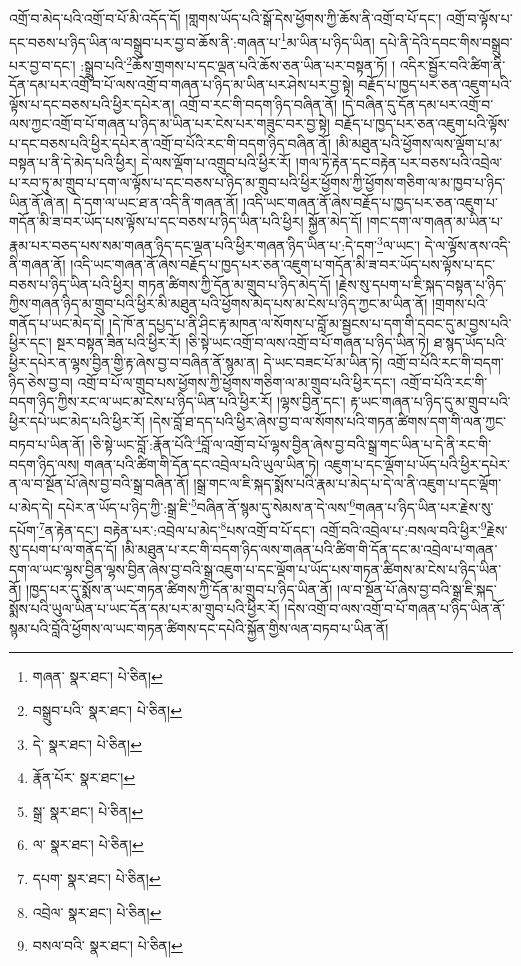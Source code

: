 འགྲོ་བ་མེད་པའི་འགྲོ་བ་པོ་མི་འདོད་དོ། །གླགས་ཡོད་པའི་སྒོ་དེས་ཕྱོགས་ཀྱི་ཆོས་ནི་འགྲོ་བ་པོ་དང་། འགྲོ་བ་ལྟོས་པ་དང་བཅས་པ་ཉིད་ཡིན་ལ་བསྒྲུབ་པར་བྱ་བ་ཆོས་ནི་:གཞན་པ་\footnote{གཞན་  སྣར་ཐང་།  པེ་ཅིན། }མ་ཡིན་པ་ཉིད་ཡིན། དཔེ་ནི་དེའི་དབང་གིས་བསྒྲུབ་པར་བྱ་བ་དང་། :སྒྲུབ་པའི་\footnote{བསྒྲུབ་པའི་  སྣར་ཐང་།  པེ་ཅིན། }ཆོས་གྲགས་པ་དང་ལྡན་པའི་ཆོས་ཅན་ཡིན་པར་བསྟན་ཏོ། །
འདིར་སྦྱོར་བའི་ཚིག་ནི་དོན་དམ་པར་འགྲོ་བ་པོ་ལས་འགྲོ་བ་གཞན་པ་ཉིད་མ་ཡིན་པར་ཤེས་པར་བྱ་སྟེ། བརྗོད་པ་ཁྱད་པར་ཅན་འཇུག་པའི་ལྟོས་པ་དང་བཅས་པའི་ཕྱིར་དཔེར་ན། འགྲོ་བ་རང་གི་བདག་ཉིད་བཞིན་ནོ། །དེ་བཞིན་དུ་དོན་དམ་པར་འགྲོ་བ་ལས་ཀྱང་འགྲོ་བ་པོ་གཞན་པ་ཉིད་མ་ཡིན་པར་ངེས་པར་གཟུང་བར་བྱ་སྟེ། བརྗོད་པ་ཁྱད་པར་ཅན་འཇུག་པའི་ལྟོས་པ་དང་བཅས་པའི་ཕྱིར་དཔེར་ན་འགྲོ་བ་པོའི་རང་གི་བདག་ཉིད་བཞིན་ནོ། །མི་མཐུན་པའི་ཕྱོགས་ལས་ལྡོག་པ་མ་བསྟན་པ་ནི་དེ་མེད་པའི་ཕྱིར། དེ་ལས་ལྡོག་པ་འགྲུབ་པའི་ཕྱིར་རོ། །གལ་ཏེ་རྟེན་དང་བརྟེན་པར་བཅས་པའི་འབྲེལ་པ་རབ་ཏུ་མ་གྲུབ་པ་དག་ལ་ལྟོས་པ་དང་བཅས་པ་ཉིད་མ་གྲུབ་པའི་ཕྱིར་ཕྱོགས་ཀྱི་ཕྱོགས་གཅིག་ལ་མ་ཁྱབ་པ་ཉིད་ཡིན་ནོ་ཞེ་ན། དེ་དག་ལ་ཡང་ཐ་ན་འདི་ནི་གཞན་ནོ། །འདི་ཡང་གཞན་ནོ་ཞེས་བརྗོད་པ་ཁྱད་པར་ཅན་འཇུག་པ་གདོན་མི་ཟ་བར་ཡོད་པས་ལྟོས་པ་དང་བཅས་པ་ཉིད་ཡིན་པའི་ཕྱིར། སྐྱོན་མེད་དོ། །གང་དག་ལ་གཞན་མ་ཡིན་པ་རྣམ་པར་བཅད་པས་སམ་གཞན་ཉིད་དང་ལྡན་པའི་ཕྱིར་གཞན་ཉིད་ཡིན་པ་:དེ་དག་\footnote{དེ་  སྣར་ཐང་།  པེ་ཅིན། }ལ་ཡང་། དེ་ལ་ལྟོས་ནས་འདི་ནི་གཞན་ནོ། །འདི་ཡང་གཞན་ནོ་ཞེས་བརྗོད་པ་ཁྱད་པར་ཅན་འཇུག་པ་གདོན་མི་ཟ་བར་ཡོད་པས་ལྟོས་པ་དང་བཅས་པ་ཉིད་ཡིན་པའི་ཕྱིར། གཏན་ཚིགས་ཀྱི་དོན་མ་གྲུབ་པ་ཉིད་མེད་དོ། །རྗེས་སུ་དཔག་པ་ཇི་སྐད་བསྟན་པ་ཉིད་ཀྱིས་གཞན་ཉིད་མ་གྲུབ་པའི་ཕྱིར་མི་མཐུན་པའི་ཕྱོགས་མེད་པས་མ་ངེས་པ་ཉིད་ཀྱང་མ་ཡིན་ནོ། །གྲགས་པའི་གནོད་པ་ཡང་མེད་དེ། །དེ་ཁོ་ན་དཔྱད་པ་ནི་ཤིང་རྟ་མཁན་ལ་སོགས་པ་བློ་མ་སྦྱངས་པ་དག་གི་དབང་དུ་མ་བྱས་པའི་ཕྱིར་དང་། སྔར་བསྟན་ཟིན་པའི་ཕྱིར་རོ། །ཅི་སྟེ་ཡང་འགྲོ་བ་ལས་འགྲོ་བ་པོ་གཞན་པ་ཉིད་ཡིན་ཏེ། ཐ་སྙད་ཡོད་པའི་ཕྱིར་དཔེར་ན་ལྷས་བྱིན་གྱི་རྟ་ཞེས་བྱ་བ་བཞིན་ནོ་སྙམ་ན། དེ་ཡང་བཟང་པོ་མ་ཡིན་ཏེ། འགྲོ་བ་པོའི་རང་གི་བདག་ཉིད་ཅེས་བྱ་བ། འགྲོ་བ་པོ་ལ་གྲུབ་པས་ཕྱོགས་ཀྱི་ཕྱོགས་གཅིག་ལ་མ་གྲུབ་པའི་ཕྱིར་དང་། འགྲོ་བ་པོའི་རང་གི་བདག་ཉིད་ཀྱིས་རང་ལ་ཡང་མ་ངེས་པ་ཉིད་ཡིན་པའི་ཕྱིར་རོ། །ལྷས་བྱིན་དང་། རྟ་ཡང་གཞན་པ་ཉིད་དུ་མ་གྲུབ་པའི་ཕྱིར་དཔེ་ཡང་མེད་པའི་ཕྱིར་རོ། །དེས་བློ་ཐ་དད་པའི་ཕྱིར་ཞེས་བྱ་བ་ལ་སོགས་པའི་གཏན་ཚིགས་དག་གི་ལན་ཀྱང་བཏབ་པ་ཡིན་ནོ། །ཅི་སྟེ་ཡང་བློ་:རྣོན་པོའི་\footnote{རྣོན་པོར་  སྣར་ཐང་། }བློ་ལ་འགྲོ་བ་པོ་ལྷས་བྱིན་ཞེས་བྱ་བའི་སྒྲ་གང་ཡིན་པ་དེ་ནི་རང་གི་བདག་ཉིད་ལས། གཞན་པའི་ཚིག་གི་དོན་དང་འབྲེལ་པའི་ཡུལ་ཡིན་ཏེ། འཇུག་པ་དང་ལྡོག་པ་ཡོད་པའི་ཕྱིར་དཔེར་ན་ལ་བ་སྔོན་པོ་ཞེས་བྱ་བའི་སྒྲ་བཞིན་ནོ། །སྒྲ་གང་ལ་ཇི་སྐད་སྨོས་པའི་རྣམ་པ་མེད་པ་དེ་ལ་ནི་འཇུག་པ་དང་ལྡོག་པ་མེད་དེ། དཔེར་ན་ཡོད་པ་ཉིད་ཀྱི་:སྒྲ་ཇི་\footnote{སྒྲ་  སྣར་ཐང་།  པེ་ཅིན། }བཞིན་ནོ་སྙམ་དུ་སེམས་ན་དེ་ལས་\footnote{ལ་  སྣར་ཐང་།  པེ་ཅིན། }གཞན་པ་ཉིད་ཡིན་པར་རྗེས་སུ་དཔོག་\footnote{དཔག་  སྣར་ཐང་།  པེ་ཅིན། }ན་རྟེན་དང་། བརྟེན་པར་:འབྲེལ་པ་མེད་\footnote{འབྲེལ་  སྣར་ཐང་།  པེ་ཅིན། }པས་འགྲོ་བ་པོ་དང་། འགྲོ་བའི་འབྲེལ་པ་:བསལ་བའི་ཕྱིར་\footnote{བསལ་བའི་  སྣར་ཐང་།  པེ་ཅིན། }རྗེས་སུ་དཔག་པ་ལ་གནོད་དོ། །མི་མཐུན་པ་རང་གི་བདག་ཉིད་ལས་གཞན་པའི་ཚིག་གི་དོན་དང་མ་འབྲེལ་པ་གཞན་དག་ལ་ཡང་ལྷས་བྱིན་ལྷས་བྱིན་ཞེས་བྱ་བའི་སྒྲ་འཇུག་པ་དང་ལྡོག་པ་ཡོད་པས་གཏན་ཚིགས་མ་ངེས་པ་ཉིད་ཡིན་ནོ། །ཁྱད་པར་དུ་སྨོས་ན་ཡང་གཏན་ཚིགས་ཀྱི་དོན་མ་གྲུབ་པ་ཉིད་ཡིན་ནོ། །ལ་བ་སྔོན་པོ་ཞེས་བྱ་བའི་སྒྲ་ཇི་སྐད་སྨོས་པའི་ཡུལ་ཡིན་པ་ཡང་དོན་དམ་པར་མ་གྲུབ་པའི་ཕྱིར་རོ། །དེས་འགྲོ་བ་ལས་འགྲོ་བ་པོ་གཞན་པ་ཉིད་ཡིན་ནོ་སྙམ་པའི་བློའི་ཕྱོགས་ལ་ཡང་གཏན་ཚིགས་དང་དཔེའི་སྐྱོན་གྱིས་ལན་བཏབ་པ་ཡིན་ནོ། 